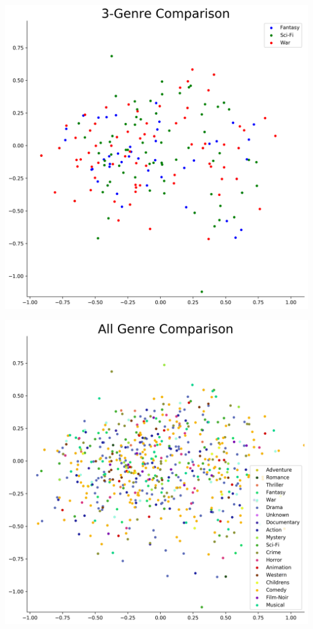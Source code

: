 \begin{appendices}
\begin{center}
\begin{minipage}{0.48\linewidth}
\end{minipage}
\begin{minipage}{0.48\linewidth}
\includegraphics[scale=0.35]{"3-Genre Comparison"}
\end{minipage}
\hfill %
\begin{minipage}{0.48\linewidth}
\includegraphics[scale=0.35]{"All Genre Comparison"}

\end{minipage}
\end{center}
\end{appendices}
